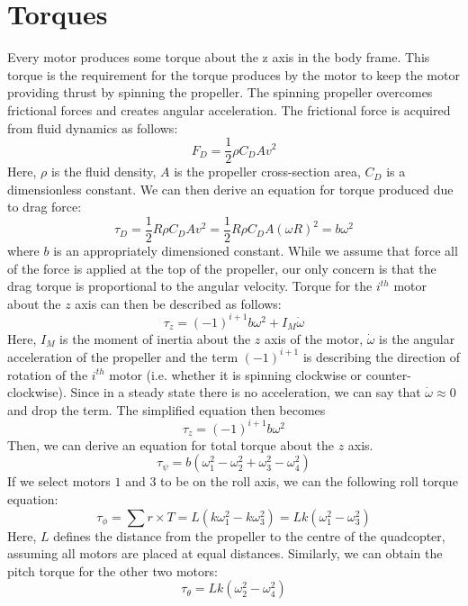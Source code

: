 \section{Torques}
Every motor produces some torque about the z axis in the body frame. This torque is the requirement for the torque produces by the motor to keep the motor providing thrust by spinning the propeller. The spinning propeller overcomes frictional forces and creates angular acceleration.
The frictional force is acquired from fluid dynamics as follows:
\begin{equation}
\label{mmTorque1}
 	F_D = \frac{1}{2}\rho C_DAv^2
\end{equation}
Here, $\rho$ is the fluid density, $A$ is the propeller cross-section area, $C_D$ is a dimensionless constant.
We can then derive an equation for torque produced due to drag force:
\begin{equation}
\label{mmTorque2}
	\tau _D = \frac{1}{2}R\rho C_DAv^2 = \frac{1}{2}R\rho C_DA(\omega R)^2 = b\omega ^2
\end{equation}
where $b$ is an appropriately dimensioned constant.
While we assume that force all of the force is applied at the top of the propeller, our only concern is that the drag torque is proportional to the angular velocity.
Torque for the $i^{th}$ motor about the $z$ axis can then be described as follows:
\begin{equation}
\label{mmTorque3}
	\tau _z = (-1)^{i+1}b\omega ^2 + I_M\dot{\omega}
\end{equation}
Here, $I_M$ is the moment of inertia about the $z$ axis of the motor, $\dot{\omega}$ is the angular acceleration of the propeller and the term $(-1)^{i+1}$ is describing the direction of rotation of the $i^{th}$ motor (i.e. whether it is spinning clockwise or counter-clockwise).
Since in a steady state there is no acceleration, we can say that $\dot{\omega} \approx 0$ and drop the term. The simplified equation then becomes
\begin{equation}
\label{mmTorque4}
	\tau _z = (-1)^{i+1}b\omega ^2
\end{equation}
Then, we can derive an equation for total torque about the $z$ axis.
\begin{equation}
\label{mmTorque5}
	\tau _\psi = b(\omega _1^2 - \omega _2^2 + \omega _3^2 - \omega _4 ^2)
\end{equation}
If we select motors $1$ and $3$ to be on the roll axis, we can the following roll torque equation:
\begin{equation}
\label{mmTorque6}
	\tau _\phi = \sum r\times T = L(k\omega _1^2 - k\omega _3^2) = Lk(\omega _1^2 - \omega _3^2)
\end{equation}
Here, $L$ defines the distance from the propeller to the centre of the quadcopter, assuming all motors are placed at equal distances.
Similarly, we can obtain the pitch torque for the other two motors:
\begin{equation}
\label{mmTorque7}
	\tau _\theta = Lk(\omega _2^2 - \omega _4^2)
\end{equation}

